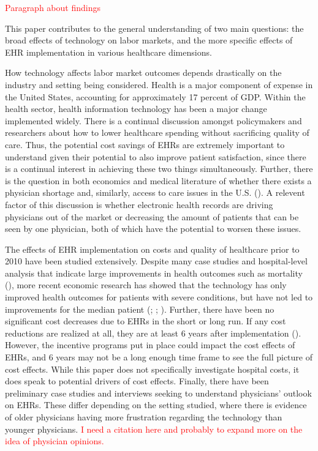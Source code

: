 \documentclass[11pt]{article}
\begin{document}
\textcolor{red}{Paragraph about findings}

This paper contributes to the general understanding of two main questions: the broad effects of technology on labor markets, and the more specific effects of EHR implementation in various healthcare dimensions.

How technology affects labor market outcomes depends drastically on the industry and setting being considered. Health is a major component of expense in the United States, accounting for approximately 17 percent of GDP. Within the health sector, health information technology has been a major change implemented widely. There is a continual discussion amongst policymakers and researchers about how to lower healthcare spending without sacrificing quality of care. Thus, the potential cost savings of EHRs are extremely important to understand given their potential to also improve patient satisfaction, since there is a continual interest in achieving these two things simultaneously. Further, there is the question in both economics and medical literature of whether there exists a physician shortage and, similarly, access to care issues in the U.S. (\cite{cooper2002economic}). A relevent factor of this discussion is whether electronic health records are driving physicians out of the market or decreasing the amount of patients that can be seen by one physician, both of which have the potential to worsen these issues.

The effects of EHR implementation on costs and quality of healthcare prior to 2010 have been studied extensively. Despite many case studies and hospital-level analysis that indicate large improvements in health outcomes such as mortality (\cite{Buntin2011TheResults}), more recent economic research has showed that the technology has only improved health outcomes for patients with severe conditions, but have not led to improvements for the median patient (\cite{Agha2014TheCare}; \cite{McCullough2016HealthCoordination}; \cite{Meyerhoefer}). Further, there have been no significant cost decreases due to EHRs in the short or long run. If any cost reductions are realized at all, they are at least 6 years after implementation (\cite{dranove2014trillion}). However, the incentive programs put in place could impact the cost effects of EHRs, and 6 years may not be a long enough time frame to see the full picture of cost effects. While this paper does not specifically investigate hospital costs, it does speak to potential drivers of cost effects. Finally, there have been preliminary case studies and interviews seeking to understand physicians' outlook on EHRs. These differ depending on the setting studied, where there is evidence of older physicians having more frustration regarding the technology than younger physicians. \textcolor{red}{I need a citation here and probably to expand more on the idea of physician opinions.}
\end{document}

